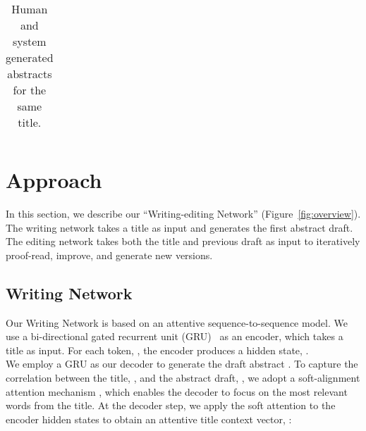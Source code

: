 \documentclass[11pt,a4paper]{article}
\begin{document}
\begin{table*}[!htb]
\begin{tabular}{|p{1.5cm}|p{13.5cm}|}
\hline
\end{tabular}
\caption{Human and system generated abstracts for the same title.}
\label{table:abstracts}
\end{table*}








 



















































 \section{Approach}
In this section, we describe our ``Writing-editing Network'' (Figure~\ref{fig:overview}). The writing network takes a title as input and generates the first abstract draft. The editing network takes both the title and previous draft as input to iteratively proof-read, improve, and generate new versions.
\subsection{Writing Network}
 \label{Writing networks}
 
Our Writing Network is based on an attentive sequence-to-sequence model. We use a bi-directional gated recurrent unit (GRU)~\citep{cho2014learning} as an encoder, which takes a title  as input. For each token, , the encoder produces a hidden state, . \\
\indent We employ a GRU as our decoder to generate the draft abstract . To capture the correlation between the title, , and the abstract draft, , we adopt a soft-alignment attention mechanism \citep{atten14}, which enables the decoder to focus on the most relevant words from the title. At the  decoder step, we apply the soft attention to the encoder hidden states to obtain an attentive title context vector, :
\end{document}
